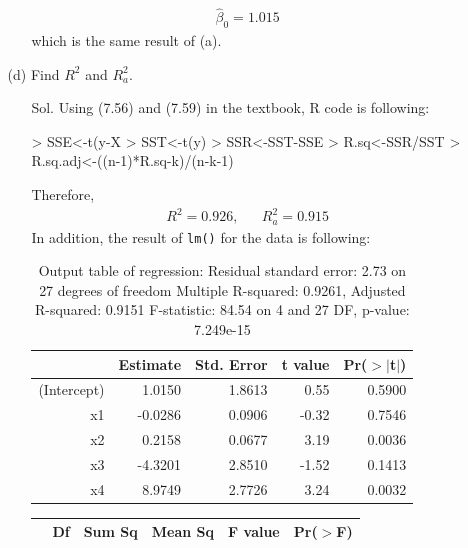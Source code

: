 \documentclass[12pt]{article} %
\begin{document}
\begin{enumerate}
\begin{enumerate}
\begin{itemize}
\begin{eqnarray*}
		  \hat{\beta}_{0}=1.015
		 \end{eqnarray*}
		 which is the same result of (a).         
        \end{itemize}   
	   \item[(d)] Find $R^{2}$ and $R^{2}_{a}$.
	   	\begin{itemize}
	   	 \item[Sol.] Using (7.56) and (7.59) in the textbook, R code is following:
\begin{Schunk}
\begin{Sinput}
> SSE<-t(y-X%
> SST<-t(y)%
> SSR<-SST-SSE
> R.sq<-SSR/SST
> R.sq.adj<-((n-1)*R.sq-k)/(n-k-1) 
\end{Sinput}
\end{Schunk}
		 Therefore, 
		 \begin{eqnarray*}
		  R^{2}=0.926,&&R^{2}_{a}=0.915
		 \end{eqnarray*}
		 In addition, the result of \verb|lm()| for the data is following:
\begin{table}[ht]
\begin{center}
\begin{tabular}{rrrrr}
  \hline
 & Estimate & Std. Error & t value & Pr($>$$|$t$|$) \\ 
  \hline
(Intercept) & 1.0150 & 1.8613 & 0.55 & 0.5900 \\ 
  x1 & -0.0286 & 0.0906 & -0.32 & 0.7546 \\ 
  x2 & 0.2158 & 0.0677 & 3.19 & 0.0036 \\ 
  x3 & -4.3201 & 2.8510 & -1.52 & 0.1413 \\ 
  x4 & 8.9749 & 2.7726 & 3.24 & 0.0032 \\ 
   \hline
\end{tabular}
\caption{Output table of regression: 
Residual standard error: 2.73 on 27 degrees of freedom
Multiple R-squared: 0.9261,	Adjusted R-squared: 0.9151 
F-statistic: 84.54 on 4 and 27 DF,  p-value: 7.249e-15}
\end{center}
\end{table}%
\begin{table}[ht]
\begin{center}
\begin{tabular}{lrrrrr}
  \hline
 & Df & Sum Sq & Mean Sq & F value & Pr($>$F) \\ 
  \hline

\end{tabular}
\end{center}
\end{table}
\end{itemize}
\end{enumerate}
\end{enumerate}
\end{document}
